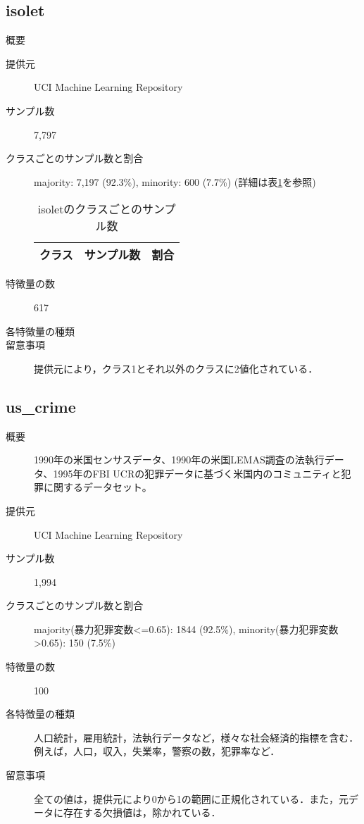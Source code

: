 \subsection{isolet}
\begin{description}
    \item[概要] \cite{isolet}
    \item[提供元] UCI Machine Learning Repository
    \item[サンプル数] 7,797
    \item[クラスごとのサンプル数と割合] majority: 7,197 (92.3\%), minority: 600 (7.7\%) (詳細は表\ref{tab:isolet}を参照)

        \begin{table}[htbp]
            \centering
            \caption{isoletのクラスごとのサンプル数}
            \label{tab:isolet}
            \begin{tabular}{lrc} \hline
                \multicolumn{1}{c}{クラス}&
                \multicolumn{1}{c}{サンプル数}&
                \multicolumn{1}{c}{割合}\\
                \hline
                \hline

                \hline
            \end{tabular}
        \end{table}

    \item[特徴量の数] 617
    \item[各特徴量の種類] \mbox{}
        
    \item[留意事項] 提供元により，クラス1とそれ以外のクラスに2値化されている．
\end{description}

\subsection{us\_crime}
\begin{description}
    \item[概要] 1990年の米国センサスデータ、1990年の米国LEMAS調査の法執行データ、1995年のFBI UCRの犯罪データに基づく米国内のコミュニティと犯罪に関するデータセット。\cite{uscrime}
    \item[提供元] UCI Machine Learning Repository
    \item[サンプル数] 1,994
    \item[クラスごとのサンプル数と割合] majority(暴力犯罪変数<=0.65): 1844 (92.5\%), minority(暴力犯罪変数>0.65): 150 (7.5\%) 

    \item[特徴量の数] 100
    \item[各特徴量の種類] \mbox{}
        人口統計，雇用統計，法執行データなど，様々な社会経済的指標を含む．例えば，人口，収入，失業率，警察の数，犯罪率など．
    \item[留意事項] 全ての値は，提供元により0から1の範囲に正規化されている．また，元データに存在する欠損値は，除かれている．
\end{description}

